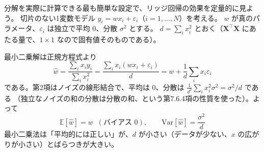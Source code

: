 分解を実際に計算できる最も簡単な設定で、リッジ回帰の効果を定量的に見よう。
切片のない1変数モデル $y_i = w x_i + \varepsilon_i$（$i = 1, \ldots, N$）を考える。
$w$ が真のパラメータ、$\varepsilon_i$ は独立で平均 $0$、分散 $\sigma^2$ とする。
$d = \sum_i x_i^2$ とおく（$\bm{X}^\top\bm{X}$ にあたる量で、$1 \times 1$ なので固有値そのものである）。

最小二乗解は正規方程式より
\begin{equation}
  \hat{w} = \frac{\sum_i x_i y_i}{\sum_i x_i^2}
  = \frac{\sum_i x_i (w x_i + \varepsilon_i)}{d}
  = w + \frac{1}{d}\sum_i x_i\varepsilon_i
  \label{eq:bv-ols}
\end{equation}
である。第2項はノイズの線形結合で、平均は $0$、分散は $\frac{1}{d^2}\sum_i x_i^2\sigma^2 = \sigma^2/d$ である
（独立なノイズの和の分散は分散の和、という第7.6.4項の性質を使った）。よって
\begin{equation}
  \mathbb{E}[\hat{w}] = w \;\;(\text{バイアス } 0), \qquad \mathrm{Var}[\hat{w}] = \frac{\sigma^2}{d}
\end{equation}
最小二乗法は「平均的には正しい」が、$d$ が小さい（データが少ない、$x$ の広がりが小さい）とばらつきが大きい。


